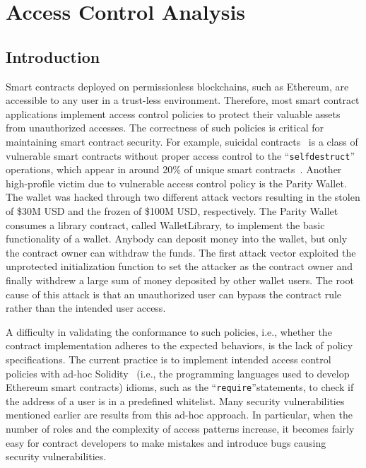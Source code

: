 \chapter{Access Control Analysis}
\label{ch:accesscontrol}

\section{Introduction}
Smart contracts deployed on permissionless blockchains, such as Ethereum, are accessible to any
user in a trust-less environment.
Therefore, most smart contract applications implement access control policies to protect their
valuable assets from unauthorized accesses.
The correctness of such policies is critical for maintaining smart contract security.
For example, suicidal contracts~\cite{nikolic2018finding} is a class of vulnerable smart contracts
without proper access control to the ``\texttt{selfdestruct}'' operations, which appear in around
20\% of unique smart contracts~\cite{oyente}.
Another high-profile victim due to vulnerable access control policy is the Parity Wallet.
The wallet was hacked through two different attack vectors resulting in the stolen of \$30M USD and
the frozen of \$100M USD, respectively.
The Parity Wallet consumes a library contract, called WalletLibrary, to implement the basic
functionality of a wallet.
Anybody can deposit money into the wallet, but only the contract owner can withdraw the funds.
The first attack vector exploited the unprotected initialization function to set the attacker as
the contract owner and finally withdrew a large sum of money deposited by other wallet users.
The root cause of this attack is that an unauthorized user can bypass the contract rule rather than
the intended user access.

A difficulty in validating the conformance to such policies, i.e., whether the contract
implementation adheres to the expected behaviors, is the lack of policy specifications. The
current practice is to implement intended access control policies with ad-hoc
Solidity~\cite{solidity} (i.e., the programming languages used to develop Ethereum smart contracts)
idioms, such as the ``\texttt{require}''statements, to check if the address of a user is in a
predefined whitelist.
Many security vulnerabilities mentioned earlier are results from this ad-hoc approach.
In particular, when the number of roles and the complexity of access patterns increase, it becomes
fairly easy for contract developers to make mistakes and introduce bugs causing security
vulnerabilities.

